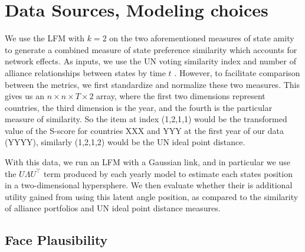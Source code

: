 \section*{Data Sources, Modeling choices}

We use the LFM with $k=2$ on the two aforementioned measures of state amity to generate a combined measure of state preference similarity which accounts for network effects. As inputs, we use the UN voting similarity index \citep{strezhnev:voeten:2013} and number of alliance relationships between states by time $t$ \citep{gibler:sarkees:2004}. However, to facilitate comparison between the metrics, we first standardize and normalize these two measures. This gives us an $n \times n \times T \times 2$ array, where the first two dimensions represent countries, the third dimension is the year, and the fourth is the particular measure of similarity. So the item at index (1,2,1,1) would be the transformed value of the S-score for countries XXX and YYY at the first year of our data (YYYY), similarly (1,2,1,2) would be the UN ideal point distance.


With this data, we run an LFM with a Gaussian link, and in particular we use the $U \Lambda U^{\top}$ term produced by each yearly model to estimate each states position in a two-dimensional hypersphere. We then evaluate whether their is additional utility gained from using this latent angle position, as compared to the similarity of alliance portfolios and UN ideal point distance measures.

\subsection*{Face Plausibility}

